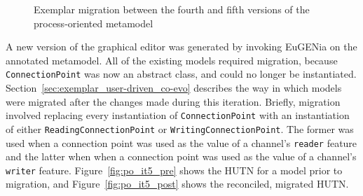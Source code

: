 \begin{figure}[htbp]
	\centering
	\caption{Exemplar migration between the fourth and fifth versions of the process-oriented metamodel}
\end{figure}

A new version of the graphical editor was generated by invoking EuGENia on the annotated metamodel. All of the existing models required migration, because \texttt{Co\-nn\-ec\-ti\-o\-nP\-oi\-nt} was now an abstract class, and could no longer be instantiated. Section~\ref{sec:exemplar_user-driven_co-evo} describes the way in which models were migrated after the changes made during this iteration. Briefly, migration involved replacing every instantiation of \texttt{Co\-nn\-ec\-ti\-o\-nP\-oi\-nt} with an instantiation of either \texttt{Re\-a\-di\-ngCo\-nn\-ec\-ti\-o\-nP\-oi\-nt} or \texttt{Wr\-i\-ti\-ngCo\-nn\-ec\-ti\-o\-nP\-oi\-nt}. The former was used when a connection point was used as the value of a channel's \texttt{re\-ad\-er} feature and the latter when  when a connection point was used as the value of a channel's \texttt{wr\-it\-er} feature. Figure~\ref{fig:po_it5_pre} shows the HUTN for a model prior to migration, and Figure~\ref{fig:po_it5_post} shows the reconciled, migrated HUTN.

